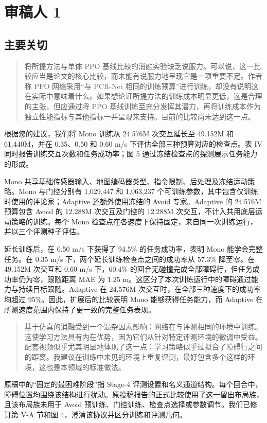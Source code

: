 \section*{审稿人 1}
\subsection*{主要关切}
\begin{quote}
将所提方法与单体 PPO 基线比较的消融实验缺乏说服力。可以说，这一比较应当是论文的核心比较，而未能有说服力地呈现它是一项重要不足。作者称 PPO 网络采用“与 PCR-Net 相同的训练预算”进行训练，却没有说明这在实际中意味着什么。如果想论证所提方法的训练成本明显更低，这是合理的主张，但应通过将 PPO 基线训练至充分发挥其潜力，再将训练成本作为独立性能指标与其他指标一并呈现来支持。目前的比较尚未达到这一点。
\end{quote}
\response
根据您的建议，我们将 Mono 训练从 24.576M 次交互延长至 49.152M 和 61.440M，并在 0.35、0.50 和 0.60 m/s 下评估全部三种预算对应的检查点。表 IV 同时报告训练交互次数和任务成功率；图 5 通过冻结检查点的探测展示任务能力的形成。

Mono 共享基础传感器输入、地图编码器类型、指令限制、后处理及冻结运动策略。Mono 与门控分别有 1,029,447 和 1,063,237 个可训练参数，其中包含仅训练时使用的评论家；Adaptive 还额外使用冻结的 Avoid 专家。Adaptive 的 24.576M 预算包含 Avoid 的 12.288M 次交互及门控的 12.288M 次交互，不计入共用底层运动策略的训练。每个 Mono 检查点在各速度下保持固定，来自同一次训练运行，并以三个评测种子评估。

延长训练后，在 0.50 m/s 下获得了 94.5\% 的任务成功率，表明 Mono 能学会完整任务。在 0.35 m/s 下，两个延长训练检查点之间的成功率从 57.3\% 降至零。在 49.152M 次交互和 0.60 m/s 下，60.4\% 的回合无碰撞完成全部障碍行，但任务成功率仍为零，跟随距离 MAE 为 1.25 m。这区分了本次训练运行中的障碍通过能力与持续目标跟随。Adaptive 在 24.576M 次交互时，在全部三种速度下的成功率均超过 95\%。因此，扩展后的比较表明 Mono 能够获得任务能力，而 Adaptive 在所测速度范围内保持了更一致的完整任务表现。

\begin{quote}
基于仿真的消融受到一个混杂因素影响：网络在与评测相同的环境中训练。这使学习方法具有内在优势，因为它们从针对特定评测环境的微调中受益。配套视频似乎尤其明显地体现了这一点：学习策略似乎过拟合了障碍行之间的距离。我建议在训练中未见的环境上重复评测，最好包含多个这样的环境，这也是本领域的标准做法。
\end{quote}
\response
原稿中的“固定的最困难阶段”指 Stage-4 评测设置和名义通道结构。每个回合中，障碍位置均围绕该结构进行扰动。原投稿报告的正式比较使用了这一留出布局族，且该布局族未用于 Avoid 预训练、门控训练、检查点选择或参数调节。我们已修订第 V-A 节和图 4，澄清该协议并区分训练和评测几何。


